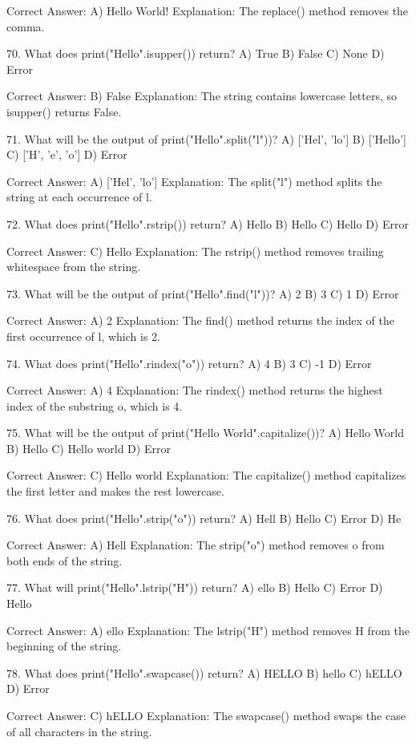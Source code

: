 Correct Answer: A) Hello World!
Explanation: The replace() method removes the comma.

70. What does print("Hello".isupper()) return?
A) True
B) False
C) None
D) Error

Correct Answer: B) False
Explanation: The string contains lowercase letters, so isupper() returns False.

71. What will be the output of print("Hello".split("l"))?
A) ['Hel', 'lo']
B) ['Hello']
C) ['H', 'e', 'o']
D) Error

Correct Answer: A) ['Hel', 'lo']
Explanation: The split("l") method splits the string at each occurrence of l.

72. What does print("Hello".rstrip()) return?
A) Hello
B) Hello
C) Hello
D) Error

Correct Answer: C) Hello
Explanation: The rstrip() method removes trailing whitespace from the string.

73. What will be the output of print("Hello".find("l"))?
A) 2
B) 3
C) 1
D) Error

Correct Answer: A) 2
Explanation: The find() method returns the index of the first occurrence of l, which is 2.

74. What does print("Hello".rindex("o")) return?
A) 4
B) 3
C) -1
D) Error

Correct Answer: A) 4
Explanation: The rindex() method returns the highest index of the substring o, which is 4.

75. What will be the output of print("Hello World".capitalize())?
A) Hello World
B) Hello
C) Hello world
D) Error

Correct Answer: C) Hello world
Explanation: The capitalize() method capitalizes the first letter and makes the rest lowercase.

76. What does print("Hello".strip("o")) return?
A) Hell
B) Hello
C) Error
D) He

Correct Answer: A) Hell
Explanation: The strip("o") method removes o from both ends of the string.

77. What will print("Hello".lstrip("H")) return?
A) ello
B) Hello
C) Error
D) Hello

Correct Answer: A) ello
Explanation: The lstrip("H") method removes H from the beginning of the string.

78. What does print("Hello".swapcase()) return?
A) HELLO
B) hello
C) hELLO
D) Error

Correct Answer: C) hELLO
Explanation: The swapcase() method swaps the case of all characters in the string.

